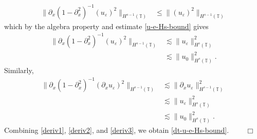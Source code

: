 \documentclass[12pt,reqno]{amsart}
\newcommand{\p}{\partial}
\newcommand{\ci}{\mathbb{T}}
\newcommand{\ee}{\varepsilon}
\theoremstyle{plain}  %
\theoremstyle{definition}
\begin{document}
\begin{appendices}
\begin{equation*}
\begin{split}
				\|\p_x (1-\p_x^2)^{-1} (u_\ee)^2\|_{H^{s-1}(\ci)}
				& \le \| (u_\ee)^2\|_{H^{s-1}(\ci)}
				\end{split}
		\end{equation*}
		which by the algebra property and estimate \eqref{u-e-Hs-bound}
		gives
		\begin{equation}
			\begin{split}
				\label{deriv2}
				\|\p_x (1-\p_x^2)^{-1} (u_\ee)^2\|_{H^{s-1}(\ci)}
				& \lesssim \|u_\ee\|^2_{H^s(\ci)} 
				\\
				& \lesssim  \|u_0\|^2_{H^s(\ci)}.
			\end{split}
		\end{equation}
		Similarly,
		\begin{equation}
			\begin{split}
				\label{deriv3}
				\|\p_x (1-\p_x^2)^{-1} (\p_x u_\ee)^2\|_{H^{s-1}(\ci)}
				& \lesssim \|\p_x u_\ee\|^2_{H^{s-1}(\ci)} 
				\\
				& \lesssim  \|u_\ee \|^2_{H^s(\ci)}
				\\
				& \lesssim \|u_0\|^2_{H^s(\ci)}.
			\end{split}
		\end{equation}
		Combining \eqref{deriv1}, \eqref{deriv2}, and \eqref{deriv3}, we
		obtain \eqref{dt-u-e-Hs-bound}. $\qquad \Box$



\end{appendices}
\end{document}
